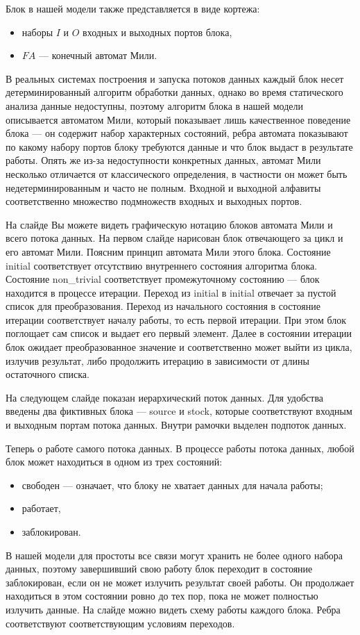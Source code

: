 \documentclass[10pt,a4paper,onecolumn]{report}
\begin{document}
  Блок в нашей модели также представляется в виде кортежа:
  \begin{itemize}
    \item наборы $I$ и $O$ входных и выходных портов блока,
    \item $FA$ --- конечный автомат Мили.
  \end{itemize}
  
  В реальных системах построения и запуска потоков данных каждый блок несет детерминированный алгоритм обработки данных,
  однако во время статического анализа данные недоступны, поэтому алгоритм блока в нашей модели описывается автоматом Мили, 
  который показывает лишь качественное поведение блока --- он содержит набор характерных состояний, ребра автомата показывают
  по какому набору портов блоку требуются данные и что блок выдаст в результате работы.
  Опять же из-за недоступности конкретных данных, автомат Мили несколько отличается от классического определения, в частности он может быть недетерминированным и
  часто не полным. Входной и выходной алфавиты соответственно множество подмножеств входных и выходных портов.
  
  На слайде Вы можете видеть графическую нотацию блоков автомата Мили и всего потока данных.
  На первом слайде нарисован блок отвечающего за цикл и его автомат Мили.
  Поясним принцип автомата Мили этого блока.
  Состояние initial соответствует отсутствию внутреннего состояния алгоритма блока.
  Состояние non\_trivial соответствует промежуточному состоянию --- блок находится в процессе итерации.
  Переход из initial в initial отвечает за пустой список для преобразования.
  Переход из начального состояния в состояние итерации соответствует началу работы, то есть первой итерации.
  При этом блок поглощает сам список и выдает его первый элемент.
  Далее в состоянии итерации блок ожидает преобразованное значение и соответственно может выйти из цикла, излучив результат,
  либо продолжить итерацию в зависимости от длины остаточного списка.
  
  На следующем слайде показан иерархический поток данных. Для удобства введены два фиктивных блока --- source и stock, которые соответствуют
  входным и выходным портам потока данных. Внутри рамочки выделен подпоток данных.
  
  Теперь о работе самого потока данных. В процессе работы потока данных, любой блок может находиться в одном из трех состояний:
  \begin{itemize}
    \item свободен --- означает, что блоку не хватает данных для начала работы;
    \item работает,
    \item заблокирован.
  \end{itemize}
  В нашей модели для простоты все связи могут хранить не более одного набора данных, поэтому завершивший свою работу блок переходит в состояние заблокирован,
  если он не может излучить результат своей работы. Он продолжает находиться в этом состоянии ровно до тех пор, пока не может полностью излучить данные.
  На слайде можно видеть схему работы каждого блока. Ребра соответствуют соответствующим условиям переходов.
  
\end{document}
